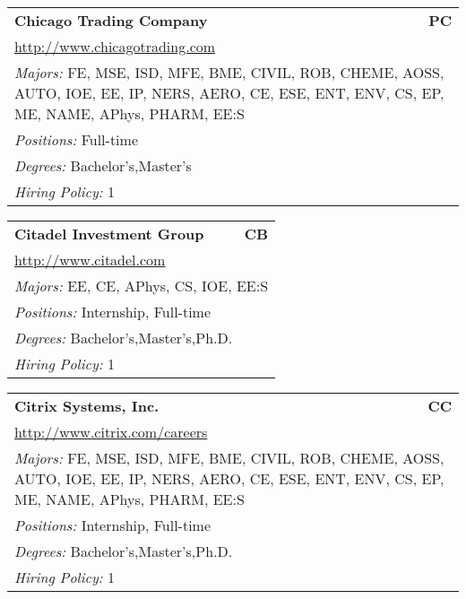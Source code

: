 \documentclass[twoside]{article}
\begin{document}
\begin{center}
\begin{multicols}{3}
\begin{FlushLeft}
\begin{minipage}{\columnwidth}\begin{tabularx}{.95\columnwidth}{Xr}
                 {\Large\bf Chicago Trading Company} & {\Large\bf PC}\\
    \multicolumn{2}{p{.95\columnwidth}}{\url{http://www.chicagotrading.com}}\\
    \multicolumn{2}{p{.95\columnwidth}}{\emph{Majors:} FE, MSE, ISD, MFE, BME, CIVIL, ROB, CHEME, AOSS, AUTO, IOE, EE, IP, NERS, AERO, CE, ESE, ENT, ENV, CS, EP, ME, NAME, APhys, PHARM, EE:S}\\
    \multicolumn{2}{p{.95\columnwidth}}{\emph{Positions:} Full-time}\\
    \multicolumn{2}{p{.95\columnwidth}}{\emph{Degrees:} Bachelor's,Master's}\\
    \multicolumn{2}{p{.95\columnwidth}}{\emph{Hiring Policy:} 1}\\
    \end{tabularx}
    
\end{minipage}
 
\begin{minipage}{\columnwidth}\begin{tabularx}{.95\columnwidth}{Xr}
                 {\Large\bf Citadel Investment Group} & {\Large\bf CB}\\
    \multicolumn{2}{p{.95\columnwidth}}{\url{http://www.citadel.com}}\\
    \multicolumn{2}{p{.95\columnwidth}}{\emph{Majors:} EE, CE, APhys, CS, IOE, EE:S}\\
    \multicolumn{2}{p{.95\columnwidth}}{\emph{Positions:} Internship, Full-time}\\
    \multicolumn{2}{p{.95\columnwidth}}{\emph{Degrees:} Bachelor's,Master's,Ph.D.}\\
    \multicolumn{2}{p{.95\columnwidth}}{\emph{Hiring Policy:} 1}\\
    \end{tabularx}
    
\end{minipage}
 
\begin{minipage}{\columnwidth}\begin{tabularx}{.95\columnwidth}{Xr}
                 {\Large\bf Citrix Systems, Inc.} & {\Large\bf CC}\\
    \multicolumn{2}{p{.95\columnwidth}}{\url{http://www.citrix.com/careers}}\\
    \multicolumn{2}{p{.95\columnwidth}}{\emph{Majors:} FE, MSE, ISD, MFE, BME, CIVIL, ROB, CHEME, AOSS, AUTO, IOE, EE, IP, NERS, AERO, CE, ESE, ENT, ENV, CS, EP, ME, NAME, APhys, PHARM, EE:S}\\
    \multicolumn{2}{p{.95\columnwidth}}{\emph{Positions:} Internship, Full-time}\\
    \multicolumn{2}{p{.95\columnwidth}}{\emph{Degrees:} Bachelor's,Master's,Ph.D.}\\
    \multicolumn{2}{p{.95\columnwidth}}{\emph{Hiring Policy:} 1}\\
    \end{tabularx}
    

\end{minipage}
\end{FlushLeft}
\end{multicols}
\end{center}
\end{document}
